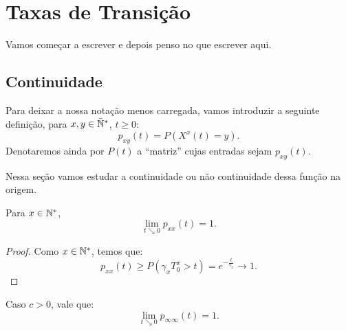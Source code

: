 \chapter{Taxas de Transição}
\label{cap:taxas}

Vamos começar a escrever e depois penso no que escrever aqui.


\section{Continuidade}
\label{sec:continuidade}

Para deixar a nossa notação menos carregada, vamos introduzir a
seguinte definição, para $x, y \in {\mathbb{\bar{N}^*}}$, $t \geq 0$:
\begin{equation}
  p_{xy} (t) = P(X^x(t) = y).
\end{equation}
Denotaremos ainda por $P(t)$ a ``matriz'' cujas entradas sejam $p_{xy}(t)$.

Nessa seção vamos estudar a continuidade ou não continuidade dessa
função na origem.

\begin{proposicao}
  Para $x \in {\mathbb{N^*}}$,
  \begin{equation}
    \lim_{t \searrow 0}p_{xx}(t) = 1.   
  \end{equation}
\end{proposicao}
\begin{proof}
  Como $x \in {\mathbb{N^*}}$, temos que:
  \begin{displaymath}
    p_{xx}(t) \geq P( \gamma_x T^x_0 > t) = e^{-\frac{t}{\gamma_x}}
    \to 1.
  \end{displaymath}
\end{proof}

\begin{proposicao}
  \label{prop:continuidade}
  Caso $c > 0$, vale que:
  \begin{displaymath}
    \lim_{t \searrow 0}p_{\infty \infty}(t) = 1.    
  \end{displaymath}
\end{proposicao}

